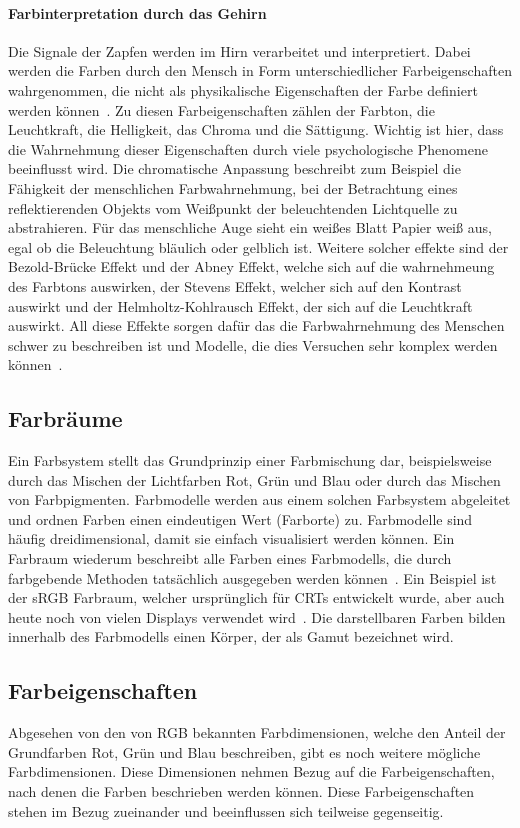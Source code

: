 \documentclass[12pt, a4paper, ngerman]{article}
\begin{document}
\paragraph{Farbinterpretation durch das Gehirn}
Die Signale der Zapfen werden im Hirn verarbeitet und interpretiert. 
Dabei werden die Farben durch den Mensch in Form unterschiedlicher Farbeigenschaften wahrgenommen, 
die nicht als physikalische Eigenschaften der Farbe definiert werden können~\cite{Ottosson_2020}.
Zu diesen Farbeigenschaften zählen der Farbton, die Leuchtkraft, die Helligkeit, das Chroma und die Sättigung.
Wichtig ist hier, dass die Wahrnehmung dieser Eigenschaften durch viele psychologische Phenomene beeinflusst wird.
Die chromatische Anpassung beschreibt zum Beispiel die Fähigkeit der menschlichen Farbwahrnehmung, 
bei der Betrachtung eines reflektierenden Objekts vom Weißpunkt der beleuchtenden Lichtquelle zu abstrahieren. 
Für das menschliche Auge sieht ein weißes Blatt Papier weiß aus, egal ob die Beleuchtung bläulich oder gelblich ist.
Weitere solcher effekte sind der Bezold-Brücke Effekt und der Abney Effekt, welche sich auf die wahrnehmeung des Farbtons auswirken,
der Stevens Effekt, welcher sich auf den Kontrast auswirkt und der Helmholtz-Kohlrausch Effekt, der sich auf die Leuchtkraft auswirkt.
All diese Effekte sorgen dafür das die Farbwahrnehmung des Menschen schwer zu beschreiben ist und Modelle, die dies Versuchen sehr komplex werden können~\cite{Color_appearance_model_2023}.

\subsection{Farbräume}
Ein Farbsystem stellt das Grundprinzip einer Farbmischung dar, 
beispielsweise durch das Mischen der Lichtfarben Rot, Grün und Blau oder durch das Mischen von Farbpigmenten.
Farbmodelle werden aus einem solchen Farbsystem abgeleitet und ordnen Farben einen eindeutigen Wert (Farborte) zu.
Farbmodelle sind häufig dreidimensional, damit sie einfach visualisiert werden können.
Ein Farbraum wiederum beschreibt alle Farben eines Farbmodells, die durch farbgebende Methoden tatsächlich ausgegeben werden können~\cite{Farbraum_2023}.
Ein Beispiel ist der \acs{sRGB} Farbraum, welcher ursprünglich für \acs{CRT}s entwickelt wurde, aber auch heute noch von vielen Displays verwendet wird~\cite{sRGB-Farbraum_2019}.
Die darstellbaren Farben bilden innerhalb des Farbmodells einen Körper, der als Gamut bezeichnet wird.

\subsection{Farbeigenschaften} 
Abgesehen von den von \acs{RGB} bekannten Farbdimensionen, welche den Anteil der Grundfarben Rot, Grün und Blau beschreiben, 
gibt es noch weitere mögliche Farbdimensionen. Diese Dimensionen nehmen Bezug auf die Farbeigenschaften, nach denen die Farben beschrieben werden können.
Diese Farbeigenschaften stehen im Bezug zueinander und beeinflussen sich teilweise gegenseitig.
\end{document}
